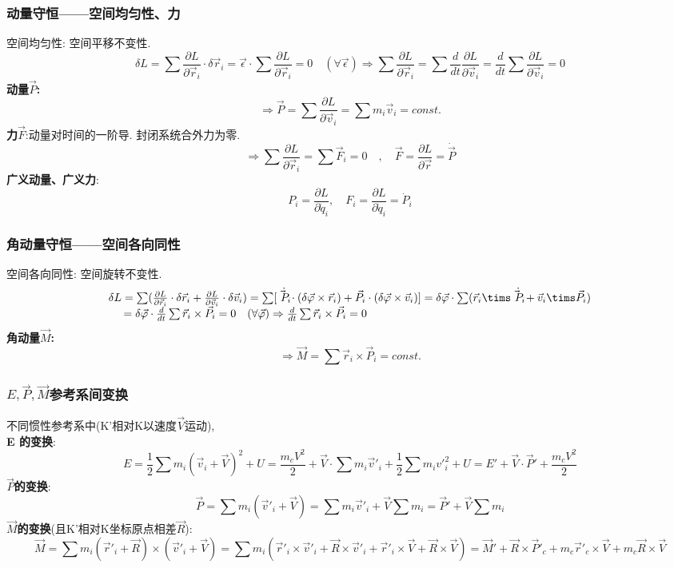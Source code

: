 \documentclass{article}
\begin{document}
\subsubsection{动量守恒——空间均匀性、力}
空间均匀性: 空间平移不变性.\\
$$\delta L = \sum \frac{\partial L}{\partial \vec r_i}\cdot \delta \vec r_i = \vec \epsilon \cdot \sum \frac{\partial L}{\partial \vec r_i} = 0\quad(\forall \vec \epsilon)
\Rightarrow \sum \frac{\partial L}{\partial \vec r_i} = \sum \frac{d}{dt} \frac{\partial L}{\partial \vec v_i} = \frac{d}{dt} \sum \frac{\partial L}{\partial \vec v_i} = 0$$
\textbf{动量$\vec P$: }
$$\Rightarrow \vec P = \sum \frac{\partial L}{\partial \vec v_i} = \sum m_i \vec v_i = const.$$
\textbf{力$\vec F$}:动量对时间的一阶导. \quad 封闭系统合外力为零.
$$\Rightarrow \sum \frac{\partial L}{\partial \vec r_i} = \sum \vec F_i = 0 \quad , \quad \vec F = \frac{\partial L}{\partial \vec r} = \dot{ \vec P }$$
\textbf{广义动量、广义力}:
$$P_i = \frac{\partial L}{\partial \dot q_i},\quad F_i = \frac{\partial L}{\partial \dot q_i} = \dot P_i$$

\subsubsection{角动量守恒——空间各向同性}
空间各向同性: 空间旋转不变性.
\begin{displaymath}
\begin{array}{ll}
\delta L = \sum (\frac{\partial L}{\partial \vec r_i} \cdot \delta \vec r_i + \frac{\partial L}{\partial \vec v_i} \cdot \delta \vec v_i) = \sum [\dot{\vec P_i} \cdot (\delta \vec \varphi \times \vec r_i) + \vec P_i \cdot ( \delta \vec \varphi \times \vec v_i )]
 = \delta \vec \varphi \cdot \sum (\vec r_i \tims \dot{\vec P_i} + \vec v_i \tims \vec P_i) \\
 \quad\  = \delta \vec \varphi \cdot \frac{d}{dt} \sum \vec r_i \times \vec P_i = 0\quad(\forall \vec \varphi) \Rightarrow \frac{d}{dt}\sum \vec r_i \times \vec P_i = 0
\end{array}
\end{displaymath}
\textbf{角动量$\vec M$: }
$$\Rightarrow \vec M = \sum \vec r_i \times \vec P_i = const.$$


\subsubsection{$E,\vec P,\vec M$参考系间变换}
不同惯性参考系中(K'相对K以速度$\vec V$运动),\\
\textbf{E 的变换}:
$$E = \frac{1}{2} \sum m_i(\vec v_i + \vec V)^2 + U = \frac{m_c V^2}{2} + \vec V \cdot \sum m_i \vec v'_i + \frac{1}{2} \sum m_i v'_i^2 + U = E' + \vec V \cdot \vec P' + \frac{m_c V^2}{2}$$
\textbf{$\vec P$的变换}:
$$\vec P = \sum m_i (\vec v'_i + \vec V) = \sum m_i \vec v'_i + \vec V \sum m_i = \vec P' + \vec V \sum m_i$$
\textbf{$\vec M$的变换}(且K'相对K坐标原点相差$\vec R$):
$$\vec M = \sum m_i (\vec r'_i + \vec R) \times (\vec v'_i + \vec V) = \sum m_i( \vec r'_i \times \vec v'_i +  \vec R \times \vec v'_i + \vec r'_i \times \vec V + \vec R \times \vec V)
 = \vec M' + \vec R \times \vec P'_c + m_c \vec r'_c \times \vec V + m_c \vec R \times \vec V$$
\end{document}
